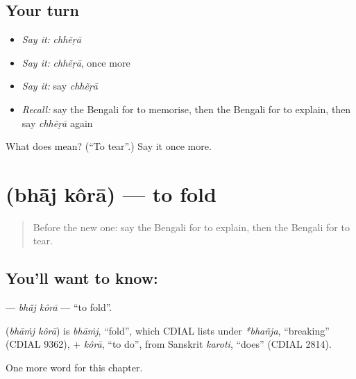 \subsection*{Your turn}
\begin{itemize}
\raggedright
  \item \emph{Say it:} \emph{chhẽṛā}
  \item \emph{Say it:} \emph{chhẽṛā}, once more
  \item \emph{Say it:} say \emph{chhẽṛā}
  \item \emph{Recall:} say the Bengali for to memorise, then the Bengali for to explain, then say \emph{chhẽṛā} again
\end{itemize}

\begin{tcolorbox}[breakable,colback=teal!4,colframe=teal!35!black,title={Before you move on}]
What does  mean? (\textquotedblleft{}To tear\textquotedblright{}.) Say it once more.
\end{tcolorbox}
\section[\texorpdfstring{\bn{ভাঁজ} \bn{করা} (bhā̃j kôrā)}{ভাঁজ করা (bhā̃j kôrā)}]{  (bhā̃j kôrā) — to fold}

\label{lesson:BN-C182-bhaj-kora}



\begin{quote}
Before the new one: say the Bengali for to explain, then the Bengali for to tear.
\end{quote}

\subsection*{You'll want to know:  }
\textbf{ } — \emph{bhā̃j kôrā} — \textquotedblleft{}to fold\textquotedblright{}.

\begin{cousinweb}
\textbf{ } (\emph{bhāṁj kôrā}) is \emph{bhāṁj}, \textquotedblleft{}fold\textquotedblright{}, which CDIAL lists under \emph{*bhañja}, \textquotedblleft{}breaking\textquotedblright{} (CDIAL 9362), + \emph{kôrā}, \textquotedblleft{}to do\textquotedblright{}, from Sanskrit \emph{karoti}, \textquotedblleft{}does\textquotedblright{} (CDIAL 2814).
\end{cousinweb}

\begin{grammarlens}[title={What you've built}]
One more word for this chapter.
\end{grammarlens}

